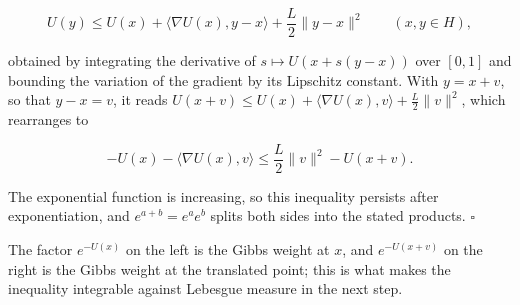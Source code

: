 \documentclass[11pt,a4paper]{article}
\begin{document}
\[U(y)\le U(x)+\langle\nabla U(x),y-x\rangle+\frac L2\|y-x\|^2\qquad(x,y\in H),\]


obtained by integrating the derivative of \(s\mapsto U(x+s(y-x))\) over \([0,1]\) and bounding the variation of the gradient by its Lipschitz constant. With \(y=x+v\), so that \(y-x=v\), it reads \(U(x+v)\le U(x)+\langle\nabla U(x),v\rangle+\frac L2\|v\|^2\), which rearranges to


\[-U(x)-\langle\nabla U(x),v\rangle\le\frac L2\|v\|^2-U(x+v).\]


The exponential function is increasing, so this inequality persists after exponentiation, and \(e^{a+b}=e^ae^b\) splits both sides into the stated products. \(\square\)




The factor \(e^{-U(x)}\) on the left is the Gibbs weight at \(x\), and \(e^{-U(x+v)}\) on the right is the Gibbs weight at the translated point; this is what makes the inequality integrable against Lebesgue measure in the next step.
\end{document}
